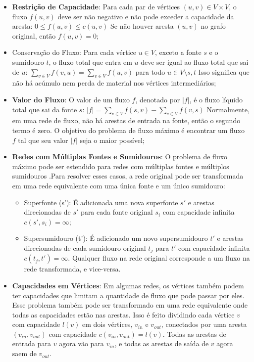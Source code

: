 \documentclass[12pt]{article}
\begin{document}
\begin{itemize}
    \item \textbf{Restrição de Capacidade}: Para cada par de vértices $(u, v) \in V \times V$, o fluxo $f(u, v)$ deve ser não negativo e não pode exceder a capacidade da aresta: $0 \le f(u, v) \le c(u, v)$ Se não houver aresta $(u, v)$ no grafo original, então $f(u, v) = 0$;
    \item Conservação do Fluxo: Para cada vértice $u \in V$, exceto a fonte $s$ e o sumidouro $t$, o fluxo total que entra em $u$ deve ser igual ao fluxo total que sai de $u$: $\sum_{v \in V} f(v, u) = \sum_{v \in V} f(u, v)$ para todo $u \in V \setminus {s, t}$ Isso significa que não há acúmulo nem perda de material nos vértices intermediários;
    \item \textbf{Valor do Fluxo}: O valor de um fluxo $f$, denotado por $|f|$, é o fluxo líquido total que sai da fonte $s$: $|f| = \sum_{v \in V} f(s, v) - \sum_{v \in V} f(v, s)$ Normalmente, em uma rede de fluxo, não há arestas de entrada na fonte, então o segundo termo é zero. O objetivo do problema de fluxo máximo é encontrar um fluxo $f$ tal que seu valor $|f|$ seja o maior possível;
    \item \textbf{Redes com Múltiplas Fontes e Sumidouros}: O problema de fluxo máximo pode ser estendido para redes com múltiplas fontes e múltiplos sumidouros \cite{goldberg1988,ahuja1993}.Para resolver esses casos, a rede original pode ser transformada em uma rede equivalente com uma única fonte e um único sumidouro:
    \begin{itemize}
        \item Superfonte (s’): É adicionada uma nova superfonte $s'$ e arestas direcionadas de $s'$ para cada fonte original $s_i$ com capacidade infinita $c(s', s_i) = \infty$;
        \item Supersumidouro (t’): É adicionado um novo supersumidouro $t'$ e arestas direcionadas de cada sumidouro original $t_j$ para $t'$ com capacidade infinita $c(t_j, t') = \infty$. Qualquer fluxo na rede original corresponde a um fluxo na rede transformada, e vice-versa.
    \end{itemize}
    \item \textbf{ Capacidades em Vértices}: Em algumas redes, os vértices também podem ter capacidades que limitam a quantidade de fluxo que pode passar por eles. Esse problema também pode ser transformado em uma rede equivalente onde todas as capacidades estão nas arestas. Isso é feito dividindo cada vértice $v$ com capacidade $l(v)$ em dois vértices, $v_{in}$ e $v_{out}$, conectados por uma aresta $(v_{in}, v_{out})$ com capacidade $c(v_{in}, v_{out}) = l(v)$. Todas as arestas de entrada para $v$ agora vão para $v_{in}$, e todas as arestas de saída de $v$ agora saem de $v_{out}$.
\end{itemize}
 
\end{document}
